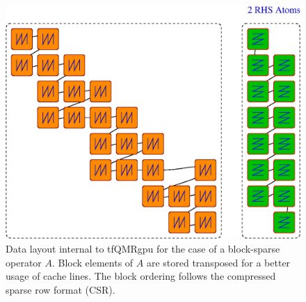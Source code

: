 \documentclass[oribibl]{llncs}
\begin{document}
\begin{figure}
	\centering
	\includegraphics[width=\textwidth]{pics/rowBSR.png} %
	\caption{Data layout internal to tfQMRgpu for the case of a block-sparse operator $A$. 
	Block elements of $A$ are stored transposed for a better usage of cache lines.
	The block ordering follows the compressed sparse row format (CSR).}
\end{figure}
\end{document}
